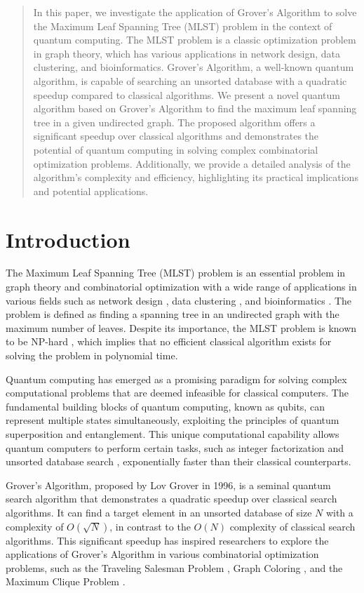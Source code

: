 \begin{abstract}
In this paper, we investigate the application of Grover's Algorithm to solve the Maximum Leaf Spanning Tree (MLST) problem in the context of quantum computing. The MLST problem is a classic optimization problem in graph theory, which has various applications in network design, data clustering, and bioinformatics. Grover's Algorithm, a well-known quantum algorithm, is capable of searching an unsorted database with a quadratic speedup compared to classical algorithms. We present a novel quantum algorithm based on Grover's Algorithm to find the maximum leaf spanning tree in a given undirected graph. The proposed algorithm offers a significant speedup over classical algorithms and demonstrates the potential of quantum computing in solving complex combinatorial optimization problems. Additionally, we provide a detailed analysis of the algorithm's complexity and efficiency, highlighting its practical implications and potential applications.

\end{abstract}

\section{Introduction}

The Maximum Leaf Spanning Tree (MLST) problem is an essential problem in graph theory and combinatorial optimization with a wide range of applications in various fields such as network design \cite{network}, data clustering \cite{clustering}, and bioinformatics \cite{bioinformatics}. The problem is defined as finding a spanning tree in an undirected graph with the maximum number of leaves. Despite its importance, the MLST problem is known to be NP-hard \cite{mlst_np}, which implies that no efficient classical algorithm exists for solving the problem in polynomial time.

Quantum computing has emerged as a promising paradigm for solving complex computational problems that are deemed infeasible for classical computers. The fundamental building blocks of quantum computing, known as qubits, can represent multiple states simultaneously, exploiting the principles of quantum superposition and entanglement. This unique computational capability allows quantum computers to perform certain tasks, such as integer factorization \cite{shor} and unsorted database search \cite{grover}, exponentially faster than their classical counterparts.

Grover's Algorithm, proposed by Lov Grover in 1996, is a seminal quantum search algorithm that demonstrates a quadratic speedup over classical search algorithms. It can find a target element in an unsorted database of size $N$ with a complexity of $O(\sqrt{N})$, in contrast to the $O(N)$ complexity of classical search algorithms. This significant speedup has inspired researchers to explore the applications of Grover's Algorithm in various combinatorial optimization problems, such as the Traveling Salesman Problem \cite{tsp_grover}, Graph Coloring \cite{graph_coloring_grover}, and the Maximum Clique Problem \cite{max_clique_grover}.

